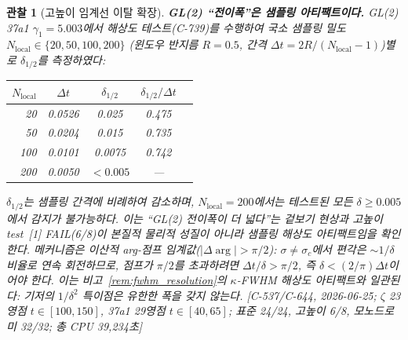 \documentclass[11pt, a4paper]{article}
\theoremstyle{definition}
\theoremstyle{plain}
\newtheorem{observation}[theorem]{관찰}
\begin{document}
\begin{observation}[고높이 임계선 이탈 확장]
\smallskip\noindent
\textbf{GL(2) ``전이폭''은 샘플링 아티팩트이다.}\;
GL(2) 37a1 $\gamma_1 = 5.003$에서 해상도 테스트(C-739)를 수행하여
국소 샘플링 밀도 $N_{\mathrm{local}} \in \{20, 50, 100, 200\}$
(윈도우 반지름 $R=0.5$, 간격 $\Delta t = 2R/(N_{\mathrm{local}}-1)$)별로
$\delta_{1/2}$를 측정하였다:

\smallskip
\begin{center}\small
\begin{tabular}{rcccc}
\toprule
$N_{\mathrm{local}}$ & $\Delta t$ & $\delta_{1/2}$ & $\delta_{1/2}/\Delta t$ \\
\midrule
20  & 0.0526 & 0.025 & 0.475 \\
50  & 0.0204 & 0.015 & 0.735 \\
100 & 0.0101 & 0.0075 & 0.742 \\
200 & 0.0050 & $<0.005$ & --- \\
\bottomrule
\end{tabular}
\end{center}

\smallskip\noindent
$\delta_{1/2}$는 샘플링 간격에 비례하여 감소하며,
$N_{\mathrm{local}}=200$에서는 테스트된 모든
$\delta \ge 0.005$에서 감지가 불가능하다.
이는 ``GL(2) 전이폭이 더 넓다''는 겉보기 현상과
고높이 test~[1] FAIL(6/8)이 본질적 물리적 성질이 아니라
\emph{샘플링 해상도 아티팩트}임을 확인한다.
메커니즘은 이산적 arg-점프 임계값($|\Delta\arg|>\pi/2$):
$\sigma \ne \sigma_c$에서 편각은 $\sim 1/\delta$ 비율로 연속 회전하므로,
점프가 $\pi/2$를 초과하려면 $\Delta t/\delta > \pi/2$,
즉 $\delta < (2/\pi)\Delta t$이어야 한다.
이는 비고~\ref{rem:fwhm_resolution}의 $\kappa$-FWHM 해상도 아티팩트와
일관된다: 기저의 $1/\delta^2$ 특이점은 유한한 폭을 갖지 않는다.
[C-537/C-644, 2026-06-25;
$\zeta$ 23영점 $t{\in}[100,150]$,
37a1 29영점 $t{\in}[40,65]$;
표준 24/24, 고높이 6/8, 모노드로미 32/32;
총 CPU 39{,}234초]
\end{observation}
\end{document}
